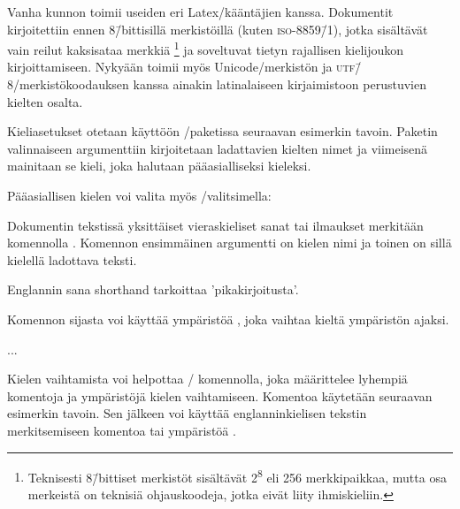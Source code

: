 Vanha kunnon  toimii useiden eri Latex\-/kääntäjien
kanssa. Dokumentit kirjoitettiin ennen 8\=/bittisillä merkistöillä
(kuten \textsc{iso-8859\=/1}), jotka sisältävät vain reilut kaksisataa
merkkiä%
\footnote{Teknisesti 8\=/bittiset merkistöt sisältävät
  2\textsuperscript8 eli 256 merkkipaikkaa, mutta osa merkeistä on
  teknisiä ohjauskoodeja, jotka eivät liity ihmiskieliin.} %
ja soveltuvat tietyn rajallisen kielijoukon kirjoittamiseen. Nykyään
 toimii myös Unicode\-/merkistön ja
\textsc{utf\=/8}\-/merkistökoodauksen kanssa ainakin latinalaiseen
kirjaimistoon perustuvien kielten osalta.

Kieliasetukset otetaan käyttöön \-/paketissa seuraavan
esimerkin tavoin. Paketin valinnaiseen argumenttiin kirjoitetaan
ladattavien kielten nimet ja viimeisenä mainitaan se kieli, joka
halutaan pääasialliseksi kieleksi.

\begin{koodilohkosis}
  \usepackage[english,greek,finnish]{babel}
\end{koodilohkosis}

Pääasiallisen kielen voi valita myös \-/valitsimella:

\begin{koodilohkosis}
  \usepackage[main=finnish,english,greek]{babel}
\end{koodilohkosis}

Dokumentin tekstissä yksittäiset vieraskieliset sanat tai ilmaukset
merkitään komennolla . Komennon ensimmäinen
argumentti on kielen nimi ja toinen on sillä kielellä ladottava teksti.

\begin{koodilohkosis}
  Englannin sana \foreignlanguage{english}{shorthand} tarkoittaa
  'pikakirjoitusta'.
\end{koodilohkosis}

Komennon sijasta voi käyttää ympäristöä , joka
vaihtaa kieltä ympäristön ajaksi.

\begin{koodilohkosis}
  \begin{otherlanguage}{greek}
    ...
  \end{otherlanguage}
\end{koodilohkosis}

Kielen vaihtamista voi helpottaa \-/ komennolla, joka
määrittelee lyhempiä komentoja ja ympäristöjä kielen vaihtamiseen.
Komentoa käytetään seuraavan esimerkin tavoin. Sen jälkeen voi käyttää
englanninkielisen tekstin merkitsemiseen komentoa 
tai ympäristöä .


